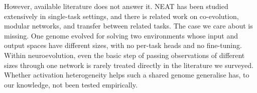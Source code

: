 \documentclass[12pt]{article}
\begin{document}

% 

However, available literature does not answer it.
NEAT has been studied extensively in single-task settings, and there is related work on co-evolution, modular networks, and transfer between related tasks.
The case we care about is missing. One genome evolved for solving two environments whose input and output spaces have different sizes, with no per-task heads and no fine-tuning.
Within neuroevolution, even the basic step of passing observations of different sizes through one network is rarely treated directly in the literature we surveyed.
Whether activation heterogeneity helps such a shared genome generalise has, to our knowledge, not been tested empirically.
\end{document}
